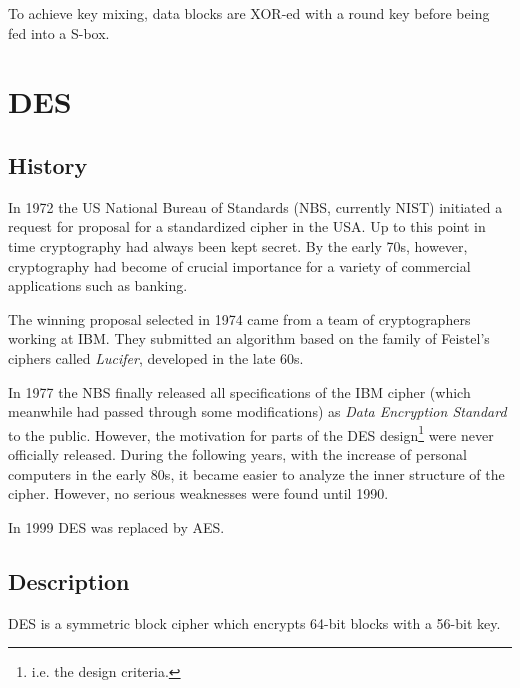 \documentclass{article}
\begin{document}
  To achieve key mixing, data blocks are XOR-ed with a round key
  before being fed into a S-box.


  
  \section{DES}
  
  \subsection{History} 

  In 1972 the US National Bureau of Standards (NBS, currently NIST)
  initiated a request for proposal for a standardized cipher in the
  USA. Up to this point in time cryptography had always been kept
  secret. By the early 70s, however, cryptography had become of
  crucial importance for a variety of commercial applications such as
  banking.

  The winning proposal selected in 1974 came from a team of
  cryptographers working at IBM.
  They submitted an algorithm based on the family of Feistel's ciphers 
  called \emph{Lucifer}, developed in the late 60s.

  In 1977 the NBS finally released all specifications of the IBM cipher 
  (which meanwhile had passed through some modifications) as 
  \emph{Data Encryption Standard} to the public. 
  However, the motivation for parts of the DES design\footnote{i.e.
  the design criteria.} were never officially released.
  During the following years, with the increase of personal computers
  in the early 80s, it became easier to analyze the inner structure of
  the cipher. However, no serious weaknesses were found until 1990.

  In 1999 DES was replaced by AES.

  \subsection{Description}

  DES is a symmetric block cipher which encrypts 64-bit blocks with a
  56-bit key. 

  \begin{center}
  \end{center}
\end{document}

